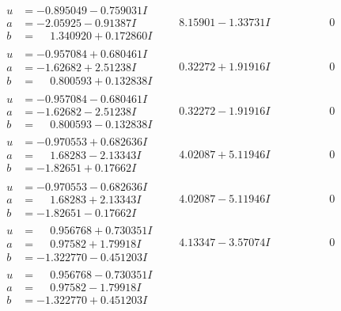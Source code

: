 \documentclass[1p]{elsarticle_modified}
\theoremstyle{definition}
\begin{document}
$$\begin{array}{c|c|c}
\begin{aligned}
u &= -0.895049 - 0.759031 I \\
a &= -2.05925 - 0.91387 I \\
b &= \phantom{-}1.340920 + 0.172860 I\end{aligned}
 & \phantom{-}8.15901 - 1.33731 I & \phantom{-0.000000 } 0 \\ \hline\begin{aligned}
u &= -0.957084 + 0.680461 I \\
a &= -1.62682 + 2.51238 I \\
b &= \phantom{-}0.800593 + 0.132838 I\end{aligned}
 & \phantom{-}0.32272 + 1.91916 I & \phantom{-0.000000 } 0 \\ \hline\begin{aligned}
u &= -0.957084 - 0.680461 I \\
a &= -1.62682 - 2.51238 I \\
b &= \phantom{-}0.800593 - 0.132838 I\end{aligned}
 & \phantom{-}0.32272 - 1.91916 I & \phantom{-0.000000 } 0 \\ \hline\begin{aligned}
u &= -0.970553 + 0.682636 I \\
a &= \phantom{-}1.68283 - 2.13343 I \\
b &= -1.82651 + 0.17662 I\end{aligned}
 & \phantom{-}4.02087 + 5.11946 I & \phantom{-0.000000 } 0 \\ \hline\begin{aligned}
u &= -0.970553 - 0.682636 I \\
a &= \phantom{-}1.68283 + 2.13343 I \\
b &= -1.82651 - 0.17662 I\end{aligned}
 & \phantom{-}4.02087 - 5.11946 I & \phantom{-0.000000 } 0 \\ \hline\begin{aligned}
u &= \phantom{-}0.956768 + 0.730351 I \\
a &= \phantom{-}0.97582 + 1.79918 I \\
b &= -1.322770 - 0.451203 I\end{aligned}
 & \phantom{-}4.13347 - 3.57074 I & \phantom{-0.000000 } 0 \\ \hline\begin{aligned}
u &= \phantom{-}0.956768 - 0.730351 I \\
a &= \phantom{-}0.97582 - 1.79918 I \\
b &= -1.322770 + 0.451203 I\end{aligned}

\end{array}$$
\end{document}
